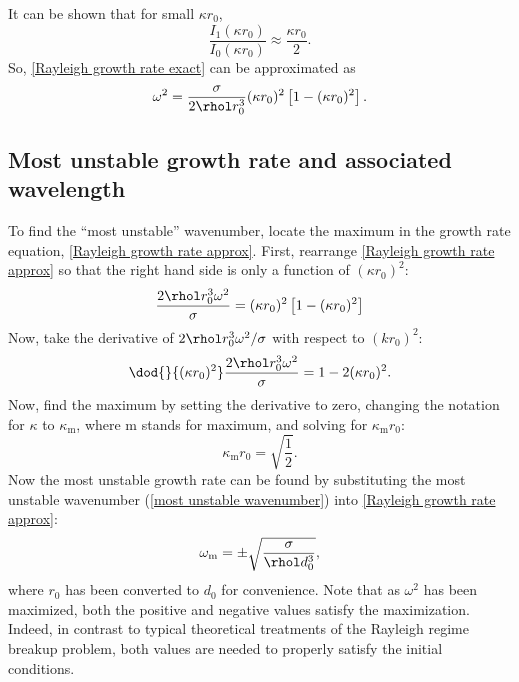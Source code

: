 \documentclass[ccbysa,note]{bmtreport}
\begin{document}
It can be shown that for small $\kappa r_0$,
\begin{equation}
   \frac{I_1(\kappa r_0)}{I_0(\kappa r_0)} \approx \frac{\kappa r_0}{2}.
\end{equation}
So, \eqref{Rayleigh growth rate exact} can be approximated as
\begin{equation}
   \omega^2 = \frac{\sigma}{2 \rhol r_0^3} (\kappa r_0)^2 \left[1 - (\kappa r_0)^2\right]. \label{eq:Rayleigh growth rate approx}
\end{equation}

\subsection{Most unstable growth rate and associated wavelength}

To find the ``most unstable'' wavenumber, locate the maximum in the growth rate equation, \eqref{Rayleigh growth rate approx}. First, rearrange \eqref{Rayleigh growth rate approx} so that the right hand side is only a function of $(\kappa r_0)^2$:
\begin{equation}
   \frac{2 \rhol r_0^3 \omega^2}{\sigma} = (\kappa r_0)^2 \left[1 - (\kappa r_0)^2\right]
\end{equation}
Now, take the derivative of $2 \rhol r_0^3 \omega^2 / \sigma$ with respect to $(k r_0)^2$:
\begin{equation}
   \dod{}{{(\kappa r_0)^2}} \frac{2 \rhol r_0^3 \omega^2}{\sigma} = 1 - 2 (\kappa r_0)^2.
\end{equation}
Now, find the maximum by setting the derivative to zero, changing the notation for $\kappa$ to $\kappa_\text{m}$, where m stands for maximum, and solving for $\kappa_\text{m} r_0$:
\begin{equation}
   \kappa_\text{m} r_0 = \sqrt{\frac{1}{2}}. \label{eq:most unstable wavenumber}
\end{equation}
Now the most unstable growth rate can be found by substituting the most unstable wavenumber (\eqref{most unstable wavenumber}) into \eqref{Rayleigh growth rate approx}:
\begin{equation}
   \omega_\text{m} = \pm \sqrt{\frac{\sigma}{\rhol d_0^3}}, \label{eq:most unstable growth rate}
\end{equation}
where $r_0$ has been converted to $d_0$ for convenience. Note that as $\omega^2$ has been maximized, both the positive and negative values satisfy the maximization. Indeed, in contrast to typical theoretical treatments of the Rayleigh regime breakup problem, both values are needed to properly satisfy the initial conditions.
\end{document}

